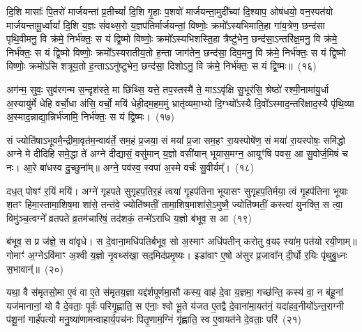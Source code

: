दि॒शि मासाः᳚ पि॒तरो॑ मार्जयन्तां प्र॒तीच्यां᳚ दि॒शि गृ॒हाः प॒शवो॑ मार्जयन्ता॒मुदी᳚च्यां दि॒श्याप॒ ओष॑धयो॒ वन॒स्पत॑यो मार्जयन्तामू॒र्ध्वायां᳚ दि॒शि य॒ज्ञः सं॑वथ्स॒रो य॒ज्ञप॑तिर्मार्जयन्तां॒ विष्णोः॒ क्रमो᳚\-ऽस्यभिमाति॒हा गा॑य॒त्रेण॒ छन्द॑सा पृथि॒वीमनु॒ वि क्र॑मे॒ निर्भ॑क्तः॒ स यं द्वि॒ष्मो विष्णोः॒ क्रमो᳚\-ऽस्यभिशस्ति॒हा त्रैष्टु॑भेन॒ छन्द॑सा॒\-ऽन्तरि॑क्ष॒मनु॒ वि क्र॑मे॒ निर्भ॑क्तः॒ स यं द्वि॒ष्मो विष्णोः॒ क्रमो᳚\-ऽस्यरातीय॒तो ह॒न्ता जाग॑तेन॒ छन्द॑सा॒ दिव॒मनु॒ वि क्र॑मे॒ निर्भ॑क्तः॒ स यं द्वि॒ष्मो विष्णोः॒ क्रमो॑\-ऽसि शत्रूय॒तो ह॒न्ता\-ऽऽ\-नु॑ष्टुभेन॒ छन्द॑सा॒ दिशो\-ऽनु॒ वि क्र॑मे॒ निर्भ॑क्तः॒ स यं द्वि॒ष्मः॥~(१६)

{\anuvakamend[{दक्षि॑णायां द्वि॒ष्मो विष्णो॒रेका॒न्नत्रि॒ꣳ॒शच्च॑}]}%

अग॑न्म॒ सुवः॒ सुव॑रगन्म स॒न्दृश॑स्ते॒ मा छि॑थ्सि॒ यत्ते॒ तप॒स्तस्मै॑ ते॒ मा\-ऽऽ\-वृ॑क्षि सु॒भूर॑सि॒ श्रेष्ठो॑ रश्मी॒नामा॑यु॒र्धा अ॒स्यायु॑र्मे धेहि वर्चो॒धा अ॑सि॒ वर्चो॒ मयि॑ धेही॒दम॒हम॒मुं भ्रातृ॑व्यमा॒भ्यो दि॒ग्भ्यो᳚\-ऽस्यै दि॒वो᳚\-ऽस्माद॒न्तरि॑क्षाद॒स्यै पृ॑थि॒व्या अ॒स्मा\-द॒न्नाद्या॒न्निर्भ॑जामि॒ निर्भ॑क्तः॒ स यं द्वि॒ष्मः।~(१७)

सं ज्योति॑षा\-ऽभूवमै॒न्द्रीमा॒वृत॑\-म॒न्वाव॑र्ते॒ सम॒हं प्र॒जया॒ सं मया᳚ प्र॒जा सम॒हꣳ रा॒यस्पोषे॑ण॒ सं मया॑ रा॒यस्पोषः॒ समि॑द्धो अग्ने मे दीदिहि समे॒द्धा ते॑ अग्ने दीद्यासं॒ वसु॑मान् य॒ज्ञो वसी॑यान् भूयास॒मग्न॒ आयूꣳ॑षि पवस॒ आ सु॒वोर्ज॒मिषं॑ च नः। आ॒रे बा॑धस्व दु॒च्छुना᳚म्॥ अग्ने॒ पव॑स्व॒ स्वपा॑ अ॒स्मे वर्चः॑ सु॒वीर्यम्᳚।~(१८)

दध॒त् पोषꣳ॑ र॒यिं मयि॑। अग्ने॑ गृहपते सुगृहप॒तिर॒हं त्वया॑ गृ॒हप॑तिना भूयासꣳ सुगृहप॒तिर्मया॒ त्वं गृ॒हप॑तिना भूयाः श॒तꣳ हिमा॒स्तामा॒शिष॒मा शा॑से॒ तन्त॑वे॒ ज्योति॑ष्मतीं॒ तामा॒शिष॒माशा॑से॒\-ऽमुष्मै॒ ज्योति॑ष्मतीं॒ कस्त्वा॑ युनक्ति॒ स त्वा॒ विमु॑ञ्च॒त्वग्ने᳚ व्रतपते व्र॒तम॑चारिषं॒ तद॑शकं॒ तन्मे॑\-ऽराधि य॒ज्ञो ब॑भूव॒ स आ~(१९)

ब॑भूव॒ स प्र ज॑ज्ञे॒ स वा॑वृधे। स दे॒वाना॒मधि॑\-पतिर्बभूव॒ सो अ॒स्माꣳ अधि॑पतीन् करोतु व॒यꣴ स्या॑म॒ पत॑यो रयी॒णाम्॥ गोमाꣳ॑ अ॒ग्ने\-ऽवि॑माꣳ अ॒श्वी य॒ज्ञो नृ॒वथ्स॑खा॒ सद॒मिद॑प्रमृ॒ष्यः। इडा॑वाꣳ ए॒षो अ॑सुर प्र॒जावा᳚न् दी॒र्घो र॒यिः पृ॑थुबु॒ध्नः स॒भावान्॑॥~(२०)

{\anuvakamend[{द्वि॒ष्मः सु॒वीर्य॒ꣳ॒ स आ पञ्च॑त्रिꣳशच्च}]}%

यथा॒ वै स॑मृतसो॒मा ए॒वं वा ए॒ते स॑मृतय॒ज्ञा यद्द॑र्\mbox{}श\-पूर्ण\-मा॒सौ कस्य॒ वाह॑ दे॒वा य॒ज्ञमा॒ गच्छ॑न्ति॒ कस्य॑ वा॒ न ब॑हू॒नां यज॑मानानां॒ यो वै दे॒वताः॒ पूर्वः॑ परिगृ॒ह्णाति॒ स ए॑नाः॒ श्वो भू॒ते य॑जत ए॒तद्वै दे॒वाना॑मा॒यत॑नं॒ यदा॑हव॒नीयो᳚\-ऽन्त॒राग्नी प॑शू॒नां गार्\mbox{}ह॑पत्यो मनु॒ष्या॑णामन्वाहार्य॒पच॑नः पितृ॒णाम॒ग्निं गृ॑ह्णाति॒ स्व ए॒वायत॑ने दे॒वताः॒ परि॑~(२१)

